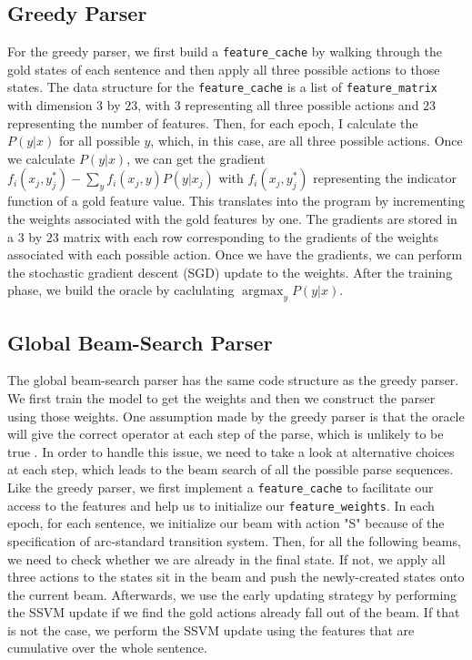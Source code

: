 \documentclass[11pt,a4paper]{article}
\DeclareMathOperator*{\argmax}{argmax} %
\begin{document}
\subsection{Greedy Parser}

For the greedy parser, we first build a \verb|feature_cache| by walking through the gold states of
each sentence and then apply all three possible actions to those states. The data structure
for the \verb|feature_cache| is a list of \verb|feature_matrix| with dimension $3$ by $23$, with
$3$ representing all three possible actions and $23$ representing the number of features.
Then, for each epoch, I calculate the $P(y|x)$ for all possible $y$, which, in this case, are
all three possible actions. Once we calculate $P(y|x)$, we can get the gradient
$f_i(x_j,y_j^*) - \sum_y f_i(x_j,y)P(y|x_j)$ with $f_i(x_j,y_j^*)$ representing the indicator
function of a gold feature value. This translates into the program by incrementing the weights
associated with the gold features by one. The gradients are stored in a $3$ by $23$ matrix
with each row corresponding to the gradients of the weights associated with each possible
action. Once we have the gradients, we can perform the stochastic gradient descent (SGD) update
to the weights. After the training phase, we build the oracle by caclulating $\argmax_yP(y|x)$.

\subsection{Global Beam-Search Parser}

The global beam-search parser has the same code structure as the greedy parser. We first train
the model to get the weights and then we construct the parser using those weights. One assumption
made by the greedy parser is that the oracle will give the correct operator at each step of the
parse, which is unlikely to be true \cite{Jurafsky:2017}. In order to handle this issue, we need
to take a look at alternative choices at each step, which leads to the beam search of all the possible
parse sequences. Like the greedy parser, we first implement a \verb|feature_cache| to facilitate our
access to the features and help us to initialize our \verb|feature_weights|. In each epoch, for each
sentence, we initialize our beam with action "S" because of 
the specification of arc-standard transition system. Then, for all the following beams, we need to check
whether we are already in the final state. If not, we apply all three actions to the states sit in the beam
and push the newly-created states onto the current beam. Afterwards, we use the early updating strategy
by performing the SSVM update if we find the gold actions already fall out of the beam. If that is not the case,
we perform the SSVM update using the features that are cumulative over the whole sentence.
\end{document}
